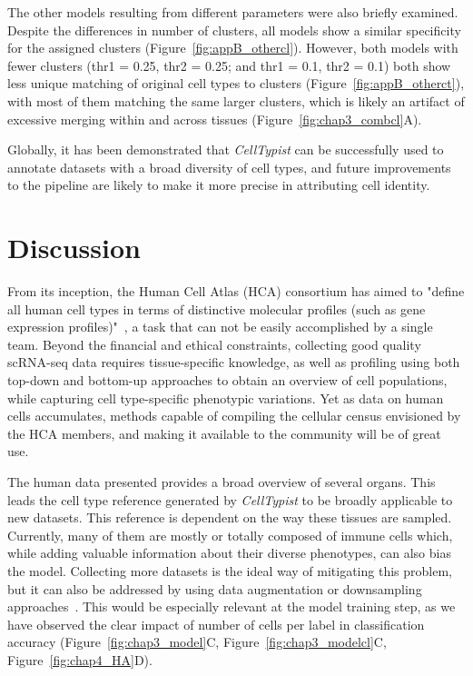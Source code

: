 The other models resulting from different parameters were also briefly examined. Despite the differences in number of clusters, all models show a similar specificity for the assigned clusters (Figure~\ref{fig:appB_othercl}). However, both models with fewer clusters (thr1 = 0.25, thr2 = 0.25; and thr1 = 0.1, thr2 = 0.1) both show less unique matching of original cell types to clusters (Figure~\ref{fig:appB_otherct}), with most of them matching the same larger clusters, which is likely an artifact of excessive merging within and across tissues (Figure~\ref{fig:chap3_combcl}A). 

Globally, it has been demonstrated that \textit{CellTypist} can be successfully used to annotate datasets with a broad diversity of cell types, and future improvements to the pipeline are likely to make it more precise in attributing cell identity. 


\section{Discussion}
\label{section4.3}
From its inception, the Human Cell Atlas (HCA) consortium has aimed to "define all human cell types in terms of distinctive molecular profiles (such as gene expression profiles)"~\citep{regev_human_2017}, a task that can not be easily accomplished by a single team. Beyond the financial and ethical constraints, collecting good quality scRNA-seq data requires tissue-specific knowledge, as well as profiling using both top-down and bottom-up approaches to obtain an overview of cell populations, while capturing cell type-specific phenotypic variations. Yet as data on human cells accumulates, methods capable of compiling the cellular census envisioned by the HCA members, and making it available to the community will be of great use.

The human data presented provides a broad overview of several organs. This leads the cell type reference generated by \textit{CellTypist} to be broadly applicable to new datasets. This reference is dependent on the way these tissues are sampled. Currently, many of them are mostly or totally composed of immune cells which, while adding valuable information about their diverse phenotypes, can also bias the model. Collecting more datasets is the ideal way of mitigating this problem, but it can also be addressed by using data augmentation or downsampling approaches~\citep{wong_understanding_2016,hie_geometric_2019}. This would be especially relevant at the model training step, as we have observed the clear impact of number of cells per label in classification accuracy (Figure~\ref{fig:chap3_model}C, Figure~\ref{fig:chap3_modelcl}C, Figure~\ref{fig:chap4_HA}D).


